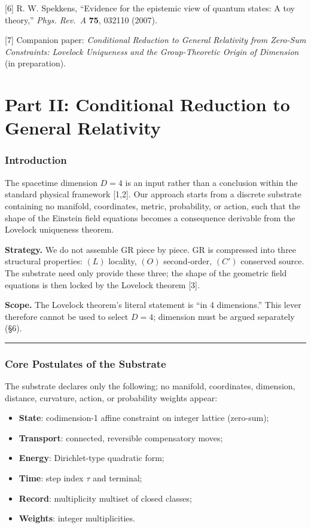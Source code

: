 \documentclass[
  11pt,
]{article}
\providecommand{\tightlist}{%
  \setlength{\itemsep}{0pt}\setlength{\parskip}{0pt}}
\begin{document}
{[}6{]} R. W. Spekkens, ``Evidence for the epistemic view of quantum
states: A toy theory,'' \emph{Phys. Rev.~A} \textbf{75}, 032110 (2007).

{[}7{]} Companion paper: \emph{Conditional Reduction to General
Relativity from Zero-Sum Constraints: Lovelock Uniqueness and the
Group-Theoretic Origin of Dimension} (in preparation).

\newpage
\part{Part II: Conditional Reduction to General Relativity}

\section{Introduction}\label{introduction}

The spacetime dimension \(D=4\) is an input rather than a conclusion
within the standard physical framework {[}1,2{]}. Our approach starts
from a discrete substrate containing no manifold, coordinates, metric,
probability, or action, such that the shape of the Einstein field
equations becomes a consequence derivable from the Lovelock uniqueness
theorem.

\textbf{Strategy.} We do not assemble GR piece by piece. GR is
compressed into three structural properties: \((L)\) locality, \((O)\)
second-order, \((C')\) conserved source. The substrate need only provide
these three; the shape of the geometric field equations is then locked
by the Lovelock theorem {[}3{]}.

\textbf{Scope.} The Lovelock theorem's literal statement is ``in 4
dimensions.'' This lever therefore cannot be used to select \(D=4\);
dimension must be argued separately (§6).

\begin{center}\rule{0.5\linewidth}{0.5pt}\end{center}

\section{Core Postulates of the
Substrate}\label{core-postulates-of-the-substrate}

The substrate declares only the following; no manifold, coordinates,
dimension, distance, curvature, action, or probability weights appear:

\begin{itemize}
\tightlist
\item
  \textbf{State}: codimension-1 affine constraint on integer lattice
  (zero-sum);
\item
  \textbf{Transport}: connected, reversible compensatory moves;
\item
  \textbf{Energy}: Dirichlet-type quadratic form;
\item
  \textbf{Time}: step index \(\tau\) and terminal;
\item
  \textbf{Record}: multiplicity multiset of closed classes;
\item
  \textbf{Weights}: integer multiplicities.
\end{itemize}
\end{document}
